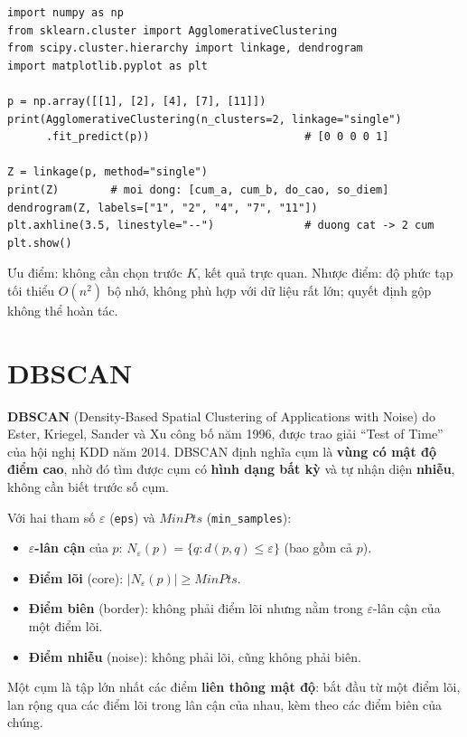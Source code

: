 \begin{lstlisting}[caption={Phân cụm phân cấp và vẽ dendrogram}]
import numpy as np
from sklearn.cluster import AgglomerativeClustering
from scipy.cluster.hierarchy import linkage, dendrogram
import matplotlib.pyplot as plt

p = np.array([[1], [2], [4], [7], [11]])
print(AgglomerativeClustering(n_clusters=2, linkage="single")
      .fit_predict(p))                        # [0 0 0 0 1]

Z = linkage(p, method="single")
print(Z)        # moi dong: [cum_a, cum_b, do_cao, so_diem]
dendrogram(Z, labels=["1", "2", "4", "7", "11"])
plt.axhline(3.5, linestyle="--")              # duong cat -> 2 cum
plt.show()
\end{lstlisting}


Ưu điểm: không cần chọn trước $K$, kết quả trực quan. Nhược điểm: độ phức tạp tối thiểu $O(n^2)$ bộ nhớ, không phù hợp với dữ liệu rất lớn; quyết định gộp không thể hoàn tác.

\section{DBSCAN}

\textbf{DBSCAN} (Density-Based Spatial Clustering of Applications with Noise) do Ester, Kriegel, Sander và Xu công bố năm 1996, được trao giải ``Test of Time'' của hội nghị KDD năm 2014. DBSCAN định nghĩa cụm là \textbf{vùng có mật độ điểm cao}, nhờ đó tìm được cụm có \textbf{hình dạng bất kỳ} và tự nhận diện \textbf{nhiễu}, không cần biết trước số cụm.

\begin{definition}
Với hai tham số $\varepsilon$ (\texttt{eps}) và $\mathit{MinPts}$ (\texttt{min\_samples}):
\begin{itemize}
    \item \textbf{$\varepsilon$-lân cận} của $p$: $N_\varepsilon(p) = \{q : d(p, q) \leq \varepsilon\}$ (bao gồm cả $p$).
    \item \textbf{Điểm lõi} (core): $|N_\varepsilon(p)| \geq \mathit{MinPts}$.
    \item \textbf{Điểm biên} (border): không phải điểm lõi nhưng nằm trong $\varepsilon$-lân cận của một điểm lõi.
    \item \textbf{Điểm nhiễu} (noise): không phải lõi, cũng không phải biên.
\end{itemize}
Một cụm là tập lớn nhất các điểm \textbf{liên thông mật độ}: bắt đầu từ một điểm lõi, lan rộng qua các điểm lõi trong lân cận của nhau, kèm theo các điểm biên của chúng.
\end{definition}

